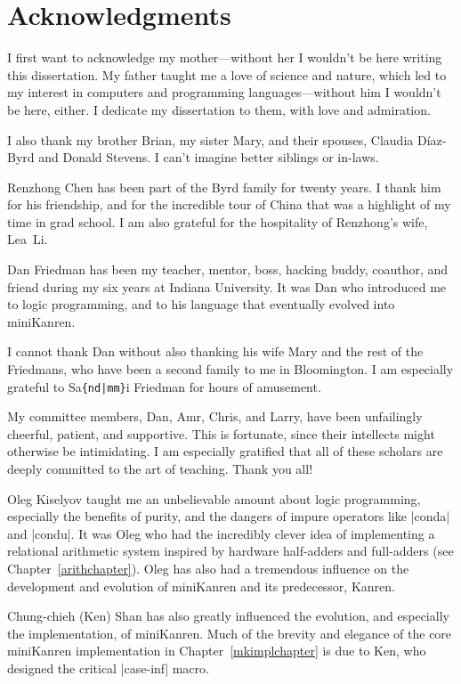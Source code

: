 \chapter*{Acknowledgments}

I first want to acknowledge my mother---without her I wouldn't be here
writing this dissertation.  My father taught me a love of science and
nature, which led to my interest in computers and programming
languages---without him I wouldn't be here, either.  I dedicate my
dissertation to them, with love and admiration.

I also thank my brother Brian, my sister Mary, and their spouses,
Claudia D\'{i}az-Byrd and Donald Stevens.  I can't imagine better
siblings or in-laws.

Renzhong Chen has been part of the Byrd family for twenty years.  I
thank him for his friendship, and for the incredible tour of China that
was a highlight of my time in grad school. I am also grateful for the
hospitality of Renzhong's wife, Lea~Li.

Dan Friedman has been my teacher, mentor, boss, hacking buddy,
coauthor, and friend during my six years at Indiana University.  It
was Dan who introduced me to logic programming, and to his language
that eventually evolved into miniKanren.

I cannot thank Dan without also thanking his wife Mary and the rest of
the Friedmans, who have been a second family to me in Bloomington.  I
am especially grateful to Sa{\tt \{nd|mm\}}i Friedman for hours of
amusement.

My committee members, Dan, Amr, Chris, and Larry, have been
unfailingly cheerful, patient, and supportive.  This is fortunate,
since their intellects might otherwise be intimidating.  I am
especially gratified that all of these scholars are deeply committed
to the art of teaching.  Thank you all!

Oleg Kiselyov taught me an unbelievable amount about logic
programming, especially the benefits of purity, and the dangers of
impure operators like \scheme|conda| and \scheme|condu|.  It was Oleg
who had the incredibly clever idea of implementing a relational
arithmetic system inspired by hardware half-adders and full-adders
(see Chapter~\ref{arithchapter}).  Oleg has also had a tremendous
influence on the development and evolution of miniKanren and its
predecessor, Kanren.

Chung-chieh (Ken) Shan has also greatly influenced the evolution, and
especially the implementation, of miniKanren.  Much of the brevity and
elegance of the core miniKanren implementation in
Chapter~\ref{mkimplchapter} is due to Ken, who designed the critical
\scheme|case-inf| macro.

